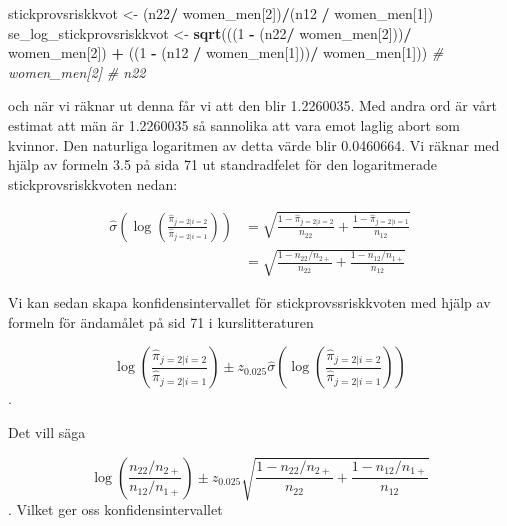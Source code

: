 \documentclass[]{article}
\newenvironment{Shaded}{\begin{snugshade}}{\end{snugshade}}
\newcommand{\CommentTok}[1]{\textcolor[rgb]{0.56,0.35,0.01}{\textit{#1}}}
\newcommand{\DecValTok}[1]{\textcolor[rgb]{0.00,0.00,0.81}{#1}}
\newcommand{\KeywordTok}[1]{\textcolor[rgb]{0.13,0.29,0.53}{\textbf{#1}}}
\newcommand{\NormalTok}[1]{#1}
\newcommand{\OperatorTok}[1]{\textcolor[rgb]{0.81,0.36,0.00}{\textbf{#1}}}
\newcommand{\StringTok}[1]{\textcolor[rgb]{0.31,0.60,0.02}{#1}}
\begin{document}
\begin{Shaded}
\begin{Highlighting}[]
\NormalTok{stickprovsriskkvot <-}\StringTok{ }\NormalTok{(n22}\OperatorTok{/}\StringTok{ }\NormalTok{women_men[}\DecValTok{2}\NormalTok{])}\OperatorTok{/}\NormalTok{(n12 }\OperatorTok{/}\StringTok{ }\NormalTok{women_men[}\DecValTok{1}\NormalTok{])}
\NormalTok{se_log_stickprovsriskkvot <-}\StringTok{ }\KeywordTok{sqrt}\NormalTok{(((}\DecValTok{1} \OperatorTok{-}\StringTok{ }\NormalTok{(n22}\OperatorTok{/}\StringTok{ }\NormalTok{women_men[}\DecValTok{2}\NormalTok{]))}\OperatorTok{/}\StringTok{ }\NormalTok{women_men[}\DecValTok{2}\NormalTok{]) }\OperatorTok{+}\StringTok{ }\NormalTok{((}\DecValTok{1} \OperatorTok{-}\StringTok{ }\NormalTok{(n12 }\OperatorTok{/}\StringTok{ }\NormalTok{women_men[}\DecValTok{1}\NormalTok{]))}\OperatorTok{/}\StringTok{ }\NormalTok{women_men[}\DecValTok{1}\NormalTok{]))}
\CommentTok{# women_men[2]}
\CommentTok{# n22}
\end{Highlighting}
\end{Shaded}

och när vi räknar ut denna får vi att den blir 1.2260035. Med andra ord
är vårt estimat att män är 1.2260035 så sannolika att vara emot laglig
abort som kvinnor. Den naturliga logaritmen av detta värde blir
0.0460664. Vi räknar med hjälp av formeln 3.5 på sida 71 ut
standradfelet för den logaritmerade stickprovsriskkvoten nedan:

\[
\begin{aligned}
\widehat{\sigma}\left(
\log \left(
\frac{\widehat{\pi}_{j = 2|i = 2}}{\widehat{\pi}_{j = 2|i = 1}}
\right) 
\right) &= \sqrt{
\frac{1 - \widehat{\pi}_{j = 2|i = 2}}{n_{22}} + \frac{1 - \widehat{\pi}_{j = 2|i = 1}}{n_{12}}
}\\
&= \sqrt{
\frac{1 - n_{22}/n_{2+} }{n_{22}} + \frac{1 - n_{12}/n_{1+}}{n_{12}}
}
\end{aligned}
\]

Vi kan sedan skapa konfidensintervallet för stickprovssriskkvoten med
hjälp av formeln för ändamålet på sid 71 i kurslitteraturen

\[
\log \left(
\frac{
\widehat{\pi}_{j = 2|i = 2}}{
\widehat{\pi}_{j = 2|i = 1}}
\right)
\pm z_{0.025}\widehat{\sigma}
\left(
\log \left(
\frac{
\widehat{\pi}_{j = 2|i = 2}}{\widehat{\pi}_{j = 2|i = 1}}
\right)
\right)
\].

Det vill säga

\[
\log \left(
\frac{
n_{22}/ n_{2+} }{
n_{12} / n_{1+}}
\right)
\pm z_{0.025}\sqrt{
\frac{1 - n_{22}/n_{2+} }{n_{22}} + \frac{1 - n_{12}/n_{1+}}{n_{12}}
}
\]. Vilket ger oss konfidensintervallet
\end{document}
